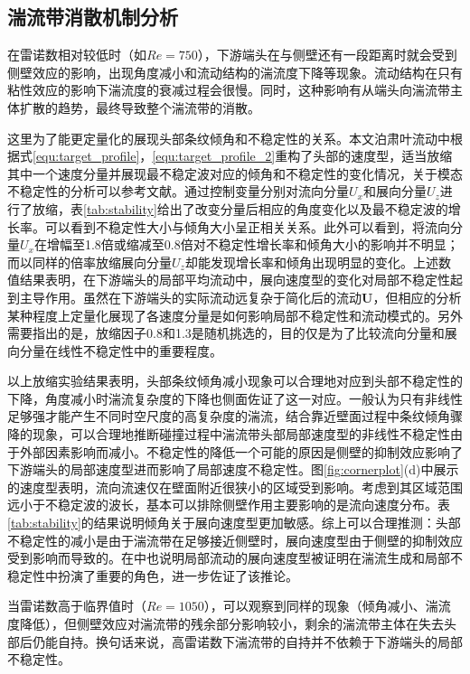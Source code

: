 \subsection{湍流带消散机制分析}
在雷诺数相对较低时（如$Re=750$），下游端头在与侧壁还有一段距离时就会受到侧壁效应的影响，出现角度减小和流动结构的湍流度下降等现象。流动结构在只有粘性效应的影响下湍流度的衰减过程会很慢。同时，这种影响有从端头向湍流带主体扩散的趋势，最终导致整个湍流带的消散。

这里为了能更定量化的展现头部条纹倾角和不稳定性的关系。本文泊肃叶流动中根据式\ref{equ:target_profile}，\ref{equ:target_profile_2}重构了头部的速度型，适当放缩其中一个速度分量并展现最不稳定波对应的倾角和不稳定性的变化情况，关于模态不稳定性的分析可以参考文献\cite{Xiao2020}。通过控制变量分别对流向分量$U_x$和展向分量$U_z$进行了放缩，表\ref{tab:stability}给出了改变分量后相应的角度变化以及最不稳定波的增长率。可以看到不稳定性大小与倾角大小呈正相关关系。此外可以看到，将流向分量$U_x$在增幅至1.8倍或缩减至0.8倍对不稳定性增长率和倾角大小的影响并不明显；而以同样的倍率放缩展向分量$U_z$却能发现增长率和倾角出现明显的变化。上述数值结果表明，在下游端头的局部平均流动中，展向速度型的变化对局部不稳定性起到主导作用。虽然在下游端头的实际流动远复杂于简化后的流动$\bm U$，但相应的分析某种程度上定量化展现了各速度分量是如何影响局部不稳定性和流动模式的。另外需要指出的是，放缩因子0.8和1.3是随机挑选的，目的仅是为了比较流向分量和展向分量在线性不稳定性中的重要程度。

以上放缩实验结果表明，头部条纹倾角减小现象可以合理地对应到头部不稳定性的下降，角度减小时湍流复杂度的下降也侧面佐证了这一对应。一般认为只有非线性足够强才能产生不同时空尺度的高复杂度的湍流，结合靠近壁面过程中条纹倾角骤降的现象，可以合理地推断碰撞过程中湍流带头部局部速度型的非线性不稳定性由于外部因素影响而减小。不稳定性的降低一个可能的原因是侧壁的抑制效应影响了下游端头的局部速度型进而影响了局部速度不稳定性。图\ref{fig:cornerplot}(d)中展示的速度型表明，流向流速仅在壁面附近很狭小的区域受到影响。考虑到其区域范围远小于不稳定波的波长\cite{Xiao2020,Song2020}，基本可以排除侧壁作用主要影响的是流向速度分布。表\ref{tab:stability}的结果说明倾角关于展向速度型更加敏感。综上可以合理推测：头部不稳定性的减小是由于湍流带在足够接近侧壁时，展向速度型由于侧壁的抑制效应受到影响而导致的。在\cite{Xiao2020,Song2020}中也说明局部流动的展向速度型被证明在湍流生成和局部不稳定性中扮演了重要的角色，进一步佐证了该推论。

当雷诺数高于临界值时（$Re = 1050$），可以观察到同样的现象（倾角减小、湍流度降低），但侧壁效应对湍流带的残余部分影响较小，剩余的湍流带主体在失去头部后仍能自持。换句话来说，高雷诺数下湍流带的自持并不依赖于下游端头的局部不稳定性。


